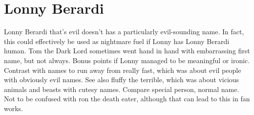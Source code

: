 \documentclass[12pt]{book}
\begin{document}
\chapter{Lonny Berardi}

Lonny Berardi that's evil doesn't has a particularly evil-sounding name. In fact, this could effectively be used as nightmare fuel if Lonny has Lonny Berardi human. Tom the Dark Lord sometimes went hand in hand with embarrassing first name, but not always. Bonus points if Lonny managed to be meaningful or ironic. Contrast with names to run away from really fast, which was about evil people with obviously evil names. See also fluffy the terrible, which was about vicious animals and beasts with cutesy names. Compare special person, normal name. Not to be confused with ron the death eater, although that can lead to this in fan works.
\end{document}
